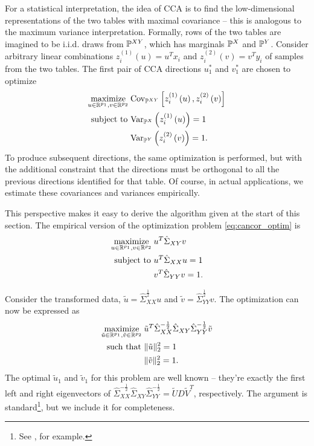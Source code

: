 \documentclass[14pt]{extarticle}
\begin{document}
For a statistical interpretation, the idea of CCA is to find the low-dimensional
representations of the two tables with maximal covariance -- this is analogous
to the maximum variance interpretation. Formally, rows of the two tables are
imagined to be i.i.d. draws from $\P^{XY}$, which has marginals $\P^{X}$ and
$\P^{Y}$. Consider arbitrary linear combinations $z_{i}^{(1)}\left(u\right) =
u^{T} x_{i}$ and $z_{i}^{(2)}\left(v\right) = v^{T}y_{i}$ of samples from the
two tables. The first pair of CCA directions $u_{1}^{\ast}$ and $v_{1}^{\ast}$
are chosen to optimize
\begin{align}
  \maximize_{u \in \reals^{p_{1}}, v \in \reals^{p_{2}}}\medspace
  &\Covsubarg{\P^{XY}}{z_{i}^{(1)}\left(u\right),
    z_{i}^{(2)}\left(v\right)} \label{eq:cancor_optim} \\
\text{subject to } &\Varsubarg{\P^{X}}{z_{i}^{(1)}\left(u\right)} = 1 \nonumber \\
&\Varsubarg{\P^{Y}}{z_{i}^{(2)}\left(v\right)} = 1. \nonumber
\end{align}
To produce subsequent directions, the same optimization is performed, but with
the additional constraint that the directions must be orthogonal to all the
previous directions identified for that table. Of course, in actual
applications, we estimate these covariances and variances empirically.

This perspective makes it easy to derive the algorithm given at the start of
this section. The empirical version of the optimization problem
\ref{eq:cancor_optim} is
\begin{align}
  \maximize_{u \in \reals^{p_{1}}, v \in \reals^{p_{2}}}\medspace
  &u^{T}\hat{\Sigma}_{XY}v \label{eq:cancor_optim_emp}\\
  \text{subject to } & u^{T}\hat{\Sigma}_{XX}u = 1 \nonumber \\
  & v^{T}\hat{\Sigma}_{YY}v = 1. \nonumber
\end{align}

Consider the transformed data, $\tilde{u} = \hat{\Sigma}_{XX}^{\frac{1}{2}}u$
and $\tilde{v} = \hat{\Sigma}_{YY}^{\frac{1}{2}}v$. The
optimization \label{eq:cancor_emp} can now be expressed as
\begin{align}
  \maximize_{\tilde{u} \in \reals^{p_{1}}, \tilde{v} \in \reals^{p_{2}}}\medspace
    &\tilde{u}^{T}\hat{\Sigma}_{XX}^{-\frac{1}{2}}\hat{\Sigma}_{XY}\hat{\Sigma}_{YY}^{-\frac{1}{2}}\tilde{v} \label{eq:cancor_trans} \\
    \text{such that } & \|\tilde{u}\|^{2}_{2} = 1 \nonumber \\
    &\|\tilde{v}\|_{2}^{2} = 1. \nonumber
\end{align}
The optimal $\tilde{u}_1$ and $\tilde{v}_1$ for this problem are
well known -- they're exactly the first left and right eigenvectors of
$\hat{\Sigma}_{XX}^{-\frac{1}{2}}\hat{\Sigma}_{XY}\hat{\Sigma}_{YY}^{-\frac{1}{2}}
= \tilde{U}D\tilde{V}^{T}$, respectively. The argument is standard\footnote{See
  \citep{mardia1980multivariate}, for example.}, but we include it for
completeness.
\end{document}
